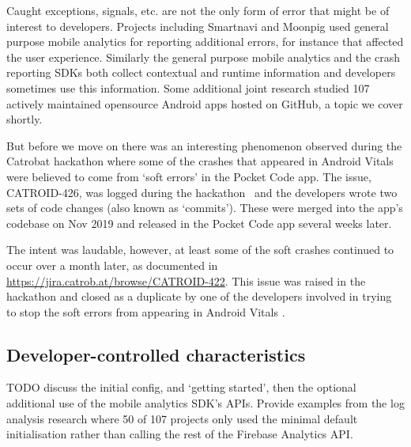 
Caught exceptions, signals, etc. are not the only form of error that might be of interest to developers. Projects including Smartnavi and Moonpig used general purpose mobile analytics for reporting additional errors, for instance that affected the user experience. Similarly the general purpose mobile analytics and the crash reporting SDKs both collect contextual and runtime information and developers sometimes use this information. Some additional joint research studied 107 actively maintained opensource Android apps hosted on GitHub, a topic we cover shortly.

But before we move on there was an interesting phenomenon observed during the Catrobat hackathon where some of the crashes that appeared in Android Vitals were believed to come from `soft errors' in the Pocket Code app. The issue, CATROID-426, was logged during the hackathon~\citep{catroid_426_soft_crashes_should_not_be_reported_to_the_play_console} and the developers wrote two sets of code changes (also known as `commits'). These were merged into the app's codebase on  Nov 2019 and released in the Pocket Code app several weeks later.

The intent was laudable, however, at least some of the soft crashes continued to occur over a month later, as documented in \url{https://jira.catrob.at/browse/CATROID-422}. This issue was raised in the hackathon and closed as a duplicate by one of the developers involved in trying to stop the soft errors from appearing in Android Vitals \citep{catroid_426_soft_crashes_should_not_be_reported_to_the_play_console}.

\subsection{Developer-controlled characteristics}
TODO discuss the initial config, and `getting started', then the optional additional use of the mobile analytics SDK's APIs. Provide examples from the log analysis research where 50 of 107 projects only used the minimal default initialisation rather than calling the rest of the Firebase Analytics API. 

